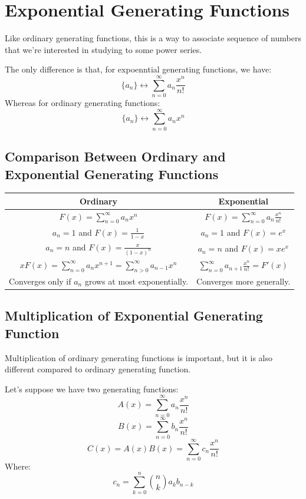 \documentclass[letterpaper]{article}
\begin{document}
\newpage 
\section{Exponential Generating Functions}
Like ordinary generating functions, this is a way to associate sequence of numbers that we're interested in studying to some power series.

\bigskip 

The only difference is that, for expoenntial generating functions, we have:
\[\{a_n\} \longleftrightarrow \sum_{n = 0}^{\infty} a_n \frac{x^n}{n!}\]
Whereas for ordinary generating functions:
\[\{a_n\} \longleftrightarrow \sum_{n = 0}^{\infty} a_n x^n\]

\subsection{Comparison Between Ordinary and Exponential Generating Functions}
\begin{center}
    \begin{tabular}{c|c}
        \textbf{Ordinary} & \textbf{Exponential} \\ 
        \hline 
        $F(x) = \sum_{n = 0}^{\infty} a_n x^n$ & $F(x) = \sum_{n = 0}^{\infty} a_n \frac{x^n}{n!}$ \\ 
        $a_n = 1$ and $F(x) = \frac{1}{1 - x}$ & $a_n = 1$ and $F(x) = e^x$ \\ 
        $a_n = n$ and $F(x) = \frac{x}{(1 - x)^n}$ & $a_n = n$ and $F(x) = xe^x$ \\ 
        $xF(x) = \sum_{n = 0}^{\infty} a_n x^{n + 1} = \sum_{n > 0}^{\infty} a_{n - 1} x^n$ & $\sum_{n = 0}^{\infty} a_{n + 1} \frac{x^n}{n!} = F'(x)$ \\ 
        Converges only if $a_n$ grows at most exponentially. & Converges more generally.
    \end{tabular}
\end{center}

\subsection{Multiplication of Exponential Generating Function}
Multiplication of ordinary generating functions is important, but it is also different compared to ordinary generating function. 

\bigskip 

Let's suppose we have two generating functions:
\[A(x) = \sum_{n = 0}^{\infty} a_n \frac{x^n}{n!}\]
\[B(x) = \sum_{n = 0}^{\infty} b_n \frac{x^n}{n!}\]
\[C(x) = A(x)B(x) = \sum_{n = 0}^{\infty} c_n \frac{x^n}{n!}\]
Where:
\[c_n = \sum_{k = 0}^{n} \binom{n}{k} a_k b_{n - k}\]
\end{document}

